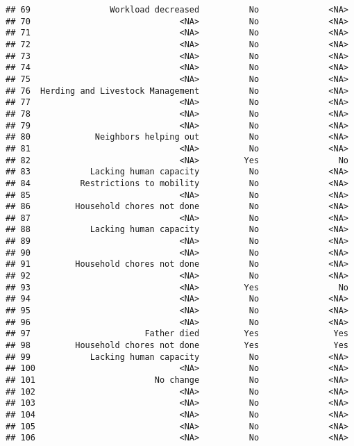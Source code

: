 \documentclass[
]{article}
\begin{document}
\begin{verbatim}
## 69                Workload decreased          No              <NA>
## 70                              <NA>          No              <NA>
## 71                              <NA>          No              <NA>
## 72                              <NA>          No              <NA>
## 73                              <NA>          No              <NA>
## 74                              <NA>          No              <NA>
## 75                              <NA>          No              <NA>
## 76  Herding and Livestock Management          No              <NA>
## 77                              <NA>          No              <NA>
## 78                              <NA>          No              <NA>
## 79                              <NA>          No              <NA>
## 80             Neighbors helping out          No              <NA>
## 81                              <NA>          No              <NA>
## 82                              <NA>         Yes                No
## 83            Lacking human capacity          No              <NA>
## 84          Restrictions to mobility          No              <NA>
## 85                              <NA>          No              <NA>
## 86         Household chores not done          No              <NA>
## 87                              <NA>          No              <NA>
## 88            Lacking human capacity          No              <NA>
## 89                              <NA>          No              <NA>
## 90                              <NA>          No              <NA>
## 91         Household chores not done          No              <NA>
## 92                              <NA>          No              <NA>
## 93                              <NA>         Yes                No
## 94                              <NA>          No              <NA>
## 95                              <NA>          No              <NA>
## 96                              <NA>          No              <NA>
## 97                       Father died         Yes               Yes
## 98         Household chores not done         Yes               Yes
## 99            Lacking human capacity          No              <NA>
## 100                             <NA>          No              <NA>
## 101                        No change          No              <NA>
## 102                             <NA>          No              <NA>
## 103                             <NA>          No              <NA>
## 104                             <NA>          No              <NA>
## 105                             <NA>          No              <NA>
## 106                             <NA>          No              <NA>

\end{verbatim}
\end{document}
